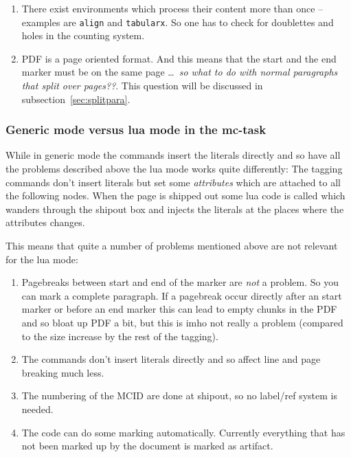 \documentclass[DIV=12,parskip=half-,bibliography=totoc]{scrartcl}
\newcommand\PDF{PDF}
\begin{document}
\begin{enumerate}[beginpenalty=10000]
  \item
  There exist environments which process their content more than once -- examples are \texttt{align} and \texttt{tabularx}.
       So one has to check for doublettes and holes in the counting system.


  \item
  \PDF{} is a page oriented format. And this means that the start and the end marker must be on the same page \ldots\ \emph{so what to do with normal paragraphs that split over pages??}. This question will be discussed in subsection~\ref{sec:splitpara}.
\end{enumerate}


\subsubsection{Generic mode versus lua mode in the mc-task}

While in generic mode the commands insert the literals directly and so have all the problems described above the lua mode works quite differently: The tagging commands don't insert literals but set some \emph{attributes} which are attached to all the following nodes. When the page is shipped out some lua code is called which wanders through the shipout box and injects the literals at the places where the attributes changes.

This means that quite a number of problems mentioned above are not relevant for the lua mode:

\begin{enumerate}
\item Pagebreaks between start and end of the marker are \emph{not} a problem. So you can mark a complete paragraph. If a pagebreak occur directly after an start marker or before an end marker this can lead to empty chunks in the \PDF{} and so bloat up \PDF{} a bit, but this is imho not really a problem (compared to the size increase by the rest of the tagging).
\item The commands don't insert literals directly and so affect line and page breaking much less.
\item The numbering of the MCID are done at shipout, so no label/ref system is needed.
\item The code can do some marking automatically. Currently everything that has not been marked up by the document is marked as artifact.
\end{enumerate}
\end{document}
